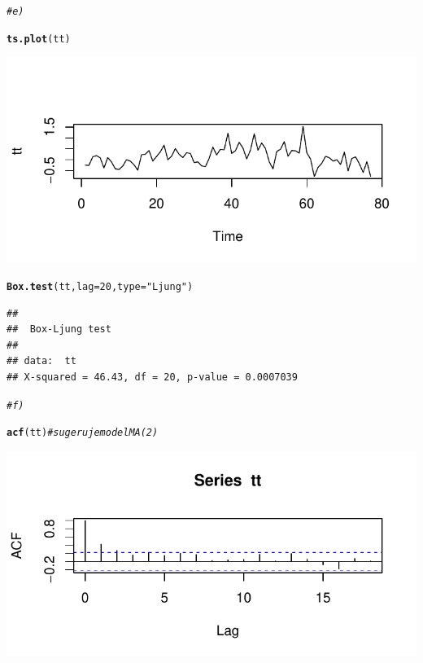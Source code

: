 \documentclass[10pt,a4paper,noindentfirst]{article}\usepackage[]{graphicx}\usepackage[]{color}
\makeatletter
\def\maxwidth{ %
  \ifdim\Gin@nat@width>\linewidth
    \linewidth
  \else
    \Gin@nat@width
  \fi
}
\newcommand{\hlnum}[1]{\textcolor[rgb]{0.686,0.059,0.569}{#1}}%
\newcommand{\hlstr}[1]{\textcolor[rgb]{0.192,0.494,0.8}{#1}}%
\newcommand{\hlcom}[1]{\textcolor[rgb]{0.678,0.584,0.686}{\textit{#1}}}%
\newcommand{\hlstd}[1]{\textcolor[rgb]{0.345,0.345,0.345}{#1}}%
\newcommand{\hlkwc}[1]{\textcolor[rgb]{0.333,0.667,0.333}{#1}}%
\newcommand{\hlkwd}[1]{\textcolor[rgb]{0.737,0.353,0.396}{\textbf{#1}}}%
\newenvironment{kframe}{%
 \def\at@end@of@kframe{}%
 \ifinner\ifhmode%
  \def\at@end@of@kframe{\end{minipage}}%
  \begin{minipage}{\columnwidth}%
 \fi\fi%
 \def\FrameCommand##1{\hskip\@totalleftmargin \hskip-\fboxsep
 \colorbox{shadecolor}{##1}\hskip-\fboxsep
     \hskip-\linewidth \hskip-\@totalleftmargin \hskip\columnwidth}%
 \MakeFramed {\advance\hsize-\width
   \@totalleftmargin\z@ \linewidth\hsize
   \@setminipage}}%
 {\par\unskip\endMakeFramed%
 \at@end@of@kframe}
\newenvironment{knitrout}{}{} %
\makeatother
\begin{document}
\begin{knitrout}
\begin{kframe}
\begin{alltt}
\hlcom{# e)}

\hlkwd{ts.plot}\hlstd{(tt)}
\end{alltt}
\end{kframe}

{\centering \includegraphics[width=\maxwidth]{figure/unnamed-chunk-48} 

}


\begin{kframe}\begin{alltt}
\hlkwd{Box.test}\hlstd{(tt,}\hlkwc{lag}\hlstd{=}\hlnum{20}\hlstd{,}\hlkwc{type}\hlstd{=}\hlstr{"Ljung"}\hlstd{)}
\end{alltt}
\begin{verbatim}
## 
## 	Box-Ljung test
## 
## data:  tt
## X-squared = 46.43, df = 20, p-value = 0.0007039
\end{verbatim}
\begin{alltt}
\hlcom{# f)}

\hlkwd{acf}\hlstd{(tt)}   \hlcom{# sugeruje model MA(2)}
\end{alltt}
\end{kframe}

{\centering \includegraphics[width=\maxwidth]{figure/unnamed-chunk-49} 

}



\end{knitrout}
\end{document}
